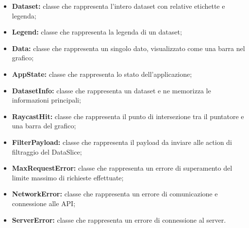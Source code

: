     \begin{itemize}
        \item \textbf{Dataset:} classe che rappresenta l'intero dataset con relative etichette e legenda;
        \item \textbf{Legend:} classe che rappresenta la legenda di un dataset;
        \item \textbf{Data:} classe che rappresenta un singolo dato, visualizzato come una barra nel grafico;
        \item \textbf{AppState:} classe che rappresenta lo stato dell'applicazione;
        \item \textbf{DatasetInfo:} classe che rappresenta un dataset e ne memorizza le informazioni principali;
        \item \textbf{RaycastHit:} classe che rappresenta il punto di intersezione tra il puntatore e una barra del grafico;
        \item \textbf{FilterPayload:} classe che rappresenta il payload da inviare alle action di filtraggio del DataSlice;
        \item \textbf{MaxRequestError:} classe che rappresenta un errore di superamento del limite massimo di richieste effettuate;
        \item \textbf{NetworkError:} classe che rappresenta un errore di comunicazione e connessione alle API;
        \item \textbf{ServerError:} classe che rappresenta un errore di connessione al server.
    \end{itemize}
